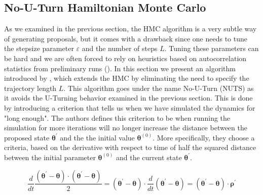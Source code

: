 \subsection{No-U-Turn Hamiltonian Monte Carlo}
As we examined in the previous section, the HMC algorithm is a very subtle way of generating proposals, but it comes with a drawback since one needs to tune the stepsize parameter $\varepsilon$ and the number of steps $L$. Tuning these parameters can be hard and we are often forced to rely on heuristics based on autocorrelation statistics from preliminary runs (\cite{neal2012mcmc}). In this section we present an algorithm introduced by \cite{hoffman2011nouturn}, which
extends the HMC by eliminating the need to specify the trajectory length $L$. This algorithm goes under the name No-U-Turn (NUTS) as it avoids the U-Turning behavior examined in the previous section. This is done by introducing a criterion that tells us when we have simulated the dynamics for "long enough". The authors defines this criterion to be when running the simulation for more iterations will no longer increase the distance between the proposed state $\boldsymbol{\theta}^\prime$ and the the initial value $\boldsymbol{\theta}^{(0)}$. More specifically, they choose a criteria, based on the derivative with respect to time of half the squared distance between the initial parameter $\boldsymbol{\theta}^{(0)}$ and the current state $\boldsymbol{\theta}^\prime$. 

\begin{equation}
    \frac{d}{d t} \frac{(\boldsymbol{\theta}^\prime-\boldsymbol{\theta}) \cdot(\boldsymbol{\theta}^\prime-\boldsymbol{\theta})}{2}=(\boldsymbol{\theta}^\prime-\boldsymbol{\theta}) \cdot \frac{d}{d t}(\boldsymbol{\theta}^\prime-\boldsymbol{\theta})=(\boldsymbol{\theta}^\prime-\boldsymbol{\theta}) \cdot \boldsymbol{\rho}^\prime
\end{equation}






